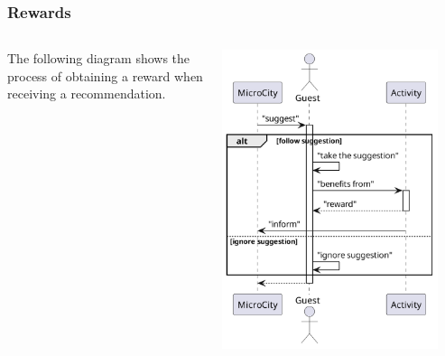 \begin{frame}
    \frametitle{Rewards}
    \begin{columns}
        \begin{column}{0.5\textwidth}
            \begin{addmargin}[0.6em]{2em}
                The following diagram shows the process of obtaining a reward when receiving a recommendation.
            \end{addmargin}
        \end{column}
        \begin{column}{0.5\textwidth}
            \begin{center}
                \includegraphics[width=0.9\textwidth]{../img/rewards}
                \label{fig:rewards}
            \end{center}
        \end{column}
    \end{columns}
\end{frame}

